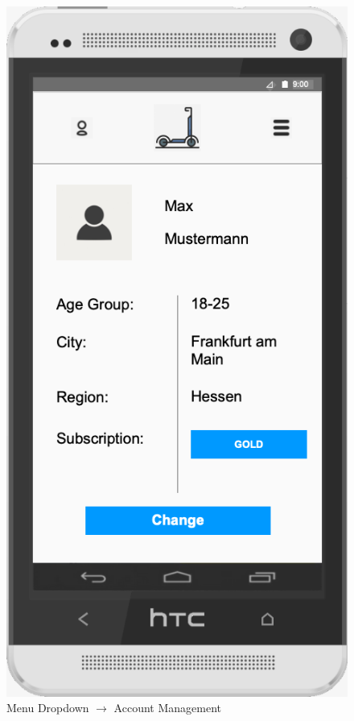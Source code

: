 \documentclass[a4paper, 12pt]{article}
\begin{document}
\begin{figure} [htbp]
  \begin{center}
    \includegraphics[scale=0.6]{03-01-menu-dropdown--account-management.png}
  \end{center}
  \caption{Menu Dropdown $\rightarrow$ Account Management}
\end{figure}
\end{document}
